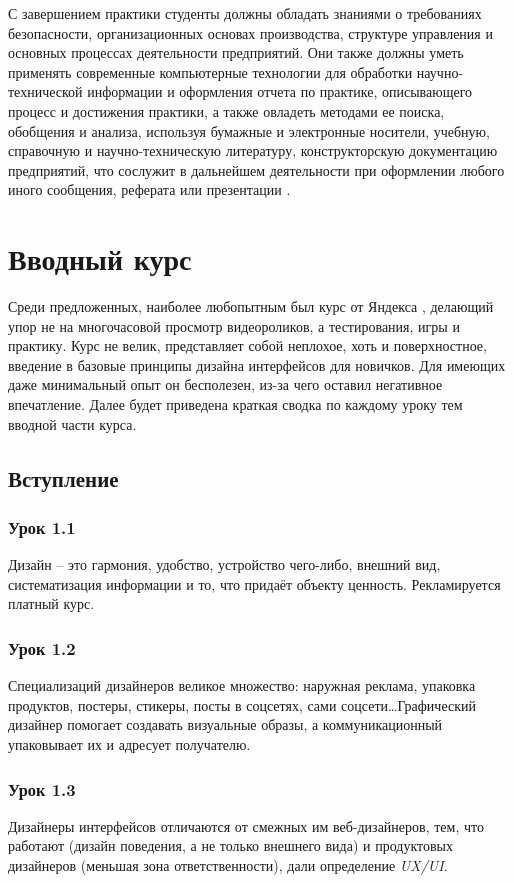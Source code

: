 \documentclass[variant=practice]{bsuir}
\begin{document}
С завершением практики студенты должны обладать знаниями о требованиях
безопасности, организационных основах производства, структуре управления и
основных процессах деятельности предприятий. Они также должны уметь применять
современные компьютерные технологии для обработки научно-технической информации
и оформления отчета по практике, описывающего процесс и достижения практики, а
также овладеть методами ее поиска, обобщения и анализа, используя бумажные и
электронные носители, учебную, справочную и научно-техническую литературу,
конструкторскую документацию предприятий, что сослужит в дальнейшем деятельности
при оформлении любого иного сообщения, реферата или презентации
\cite{about-practice}.

\chapter{Вводный курс }

Среди предложенных, наиболее любопытным был курс от Яндекса \cite{about-yandex},
делающий упор не на многочасовой просмотр видеороликов, а тестирования, игры и
практику. Курс не велик, представляет собой неплохое, хоть и поверхностное,
введение в базовые принципы дизайна интерфейсов для новичков. Для имеющих даже
минимальный опыт он бесполезен, из-за чего оставил негативное впечатление. Далее
будет приведена краткая сводка по каждому уроку тем вводной части курса.

\section{Вступление}

\subsection{Урок 1.1} Дизайн -- это гармония, удобство, устройство чего-либо,
внешний вид, систематизация информации и то, что придаёт объекту ценность.
Рекламируется платный курс.

\subsection{Урок 1.2} Специализаций дизайнеров великое множество: наружная
реклама, упаковка продуктов, постеры, стикеры, посты в соцсетях, сами
соцсети\dots Графический дизайнер помогает создавать визуальные образы, а
коммуникационный упаковывает их и адресует получателю.

\subsection{Урок 1.3} Дизайнеры интерфейсов отличаются от смежных им
веб-дизайнеров, тем, что работают (дизайн поведения, а не только внешнего вида)
и продуктовых дизайнеров (меньшая зона ответственности), дали определение
\textit{UX/UI}.
\end{document}
